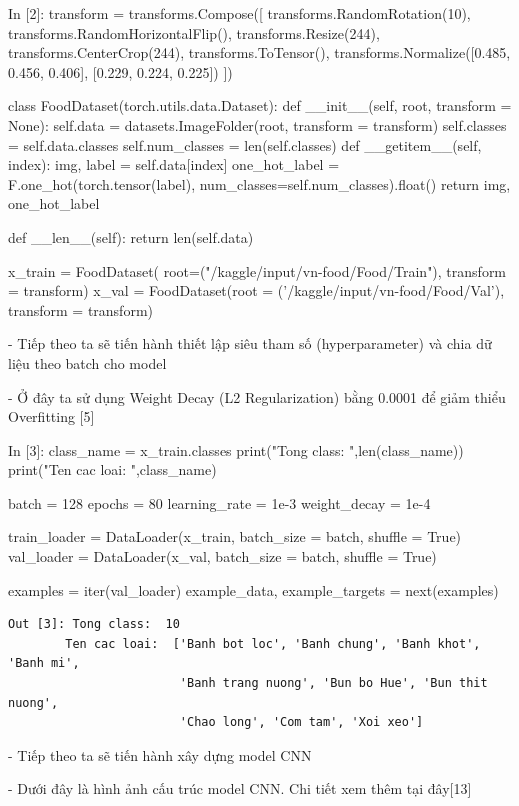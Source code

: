 \documentclass[12pt, a4paper]{article}
\begin{document}
\begin{python}
In [2]: transform = transforms.Compose([
                transforms.RandomRotation(10),      
                transforms.RandomHorizontalFlip(),  
                transforms.Resize(244),             
                transforms.CenterCrop(244),         
                transforms.ToTensor(),
                transforms.Normalize([0.485, 0.456, 0.406],
                                     [0.229, 0.224, 0.225])
        ])
        
        class FoodDataset(torch.utils.data.Dataset):
            def __init__(self, root, transform = None):
                self.data = datasets.ImageFolder(root, transform = transform)
                self.classes = self.data.classes
                self.num_classes = len(self.classes)
            def __getitem__(self, index):
                img, label = self.data[index]
                one_hot_label = F.one_hot(torch.tensor(label), num_classes=self.num_classes).float()
                return img, one_hot_label   
            
            def __len__(self):
                    return len(self.data)
                
        x_train = FoodDataset( root=("/kaggle/input/vn-food/Food/Train"), transform = transform)
        x_val = FoodDataset(root = ('/kaggle/input/vn-food/Food/Val'), transform = transform)
\end{python}

\par - Tiếp theo ta sẽ tiến hành thiết lập siêu tham số (hyperparameter) và chia dữ liệu theo batch
cho model
\par - Ở đây ta sử dụng Weight Decay (L2 Regularization) bằng 0.0001 để giảm thiểu Overfitting [5]
\begin{python}
In [3]: class_name = x_train.classes
        print("Tong class: ",len(class_name))
        print("Ten cac loai: ",class_name)
        
        batch = 128
        epochs = 80
        learning_rate = 1e-3
        weight_decay = 1e-4
        
        train_loader = DataLoader(x_train, batch_size = batch, shuffle = True)
        val_loader = DataLoader(x_val, batch_size = batch, shuffle = True)
        
        
        examples = iter(val_loader)
        example_data, example_targets = next(examples)
\end{python}

\begin{verbatim}
Out [3]: Tong class:  10
        Ten cac loai:  ['Banh bot loc', 'Banh chung', 'Banh khot', 'Banh mi', 
                        'Banh trang nuong', 'Bun bo Hue', 'Bun thit nuong', 
                        'Chao long', 'Com tam', 'Xoi xeo']    
\end{verbatim}
\newpage
\par - Tiếp theo ta sẽ tiến hành xây dựng model CNN
\par - Dưới đây là hình ảnh cấu trúc model CNN. Chi tiết xem thêm tại đây[13]
\end{document}
